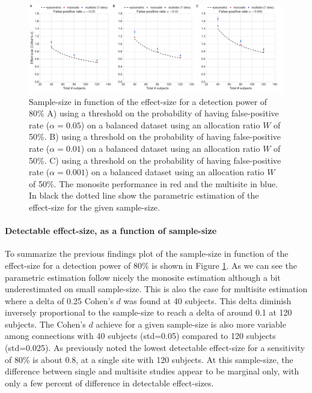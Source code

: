 \documentclass[authoryear]{elsarticle}
\begin{document}
\begin{figure}[tbp]
\centering
\includegraphics[width=\textwidth]{../figures/samplesize_x_effectsize.png}
\caption[]{
Sample-size in function of the effect-size for a detection power of 80\%
A) using a threshold on the probability of having false-positive rate ($\alpha=0.05$) on a balanced dataset using an allocation ratio $W$ of 50\%.
B) using a threshold on the probability of having false-positive rate ($\alpha=0.01$) on a balanced dataset using an allocation ratio $W$ of 50\%.
C) using a threshold on the probability of having false-positive rate ($\alpha=0.001$) on a balanced dataset using an allocation ratio $W$ of 50\%.
The monosite performance in red and the multisite in blue. In black the dotted line show the parametric estimation of the effect-size for the given sample-size.
}
\label{fig_sampeffect_curves_alpha001}
\end{figure}

\paragraph{Detectable effect-size, as a function of sample-size} To summarize the previous findings plot of the sample-size in function of the effect-size for a detection power of 80\% is shown in Figure \ref{fig_sampeffect_curves_alpha001}. As we can see the parametric estimation follow nicely the monosite estimation although a bit underestimated on small sample-size. This is also the case for multisite estimation where a delta of 0.25 Cohen's $d$ was found at 40 subjects. This delta diminish inversely proportional to the sample-size to reach a delta of around 0.1 at 120 subjects. The Cohen's $d$ achieve for a given sample-size is also more variable among connections with 40 subjects (std=0.05) compared to 120 subjects (std=0.025). As previously noted the lowest detectable effect-size for a sensitivity of 80\% is about 0.8, at a single site with 120 subjects. At this sample-size, the difference between single and multisite studies appear to be marginal only, with only a few percent of difference in detectable effect-sizes. 
\end{document}
